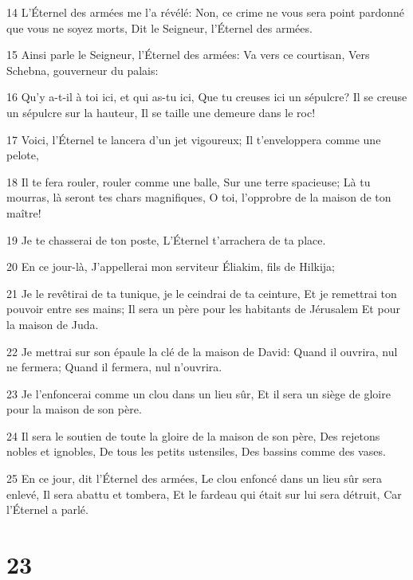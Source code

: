 \par 14 L'Éternel des armées me l'a révélé: Non, ce crime ne vous sera point pardonné que vous ne soyez morts, Dit le Seigneur, l'Éternel des armées.
\par 15 Ainsi parle le Seigneur, l'Éternel des armées: Va vers ce courtisan, Vers Schebna, gouverneur du palais:
\par 16 Qu'y a-t-il à toi ici, et qui as-tu ici, Que tu creuses ici un sépulcre? Il se creuse un sépulcre sur la hauteur, Il se taille une demeure dans le roc!
\par 17 Voici, l'Éternel te lancera d'un jet vigoureux; Il t'enveloppera comme une pelote,
\par 18 Il te fera rouler, rouler comme une balle, Sur une terre spacieuse; Là tu mourras, là seront tes chars magnifiques, O toi, l'opprobre de la maison de ton maître!
\par 19 Je te chasserai de ton poste, L'Éternel t'arrachera de ta place.
\par 20 En ce jour-là, J'appellerai mon serviteur Éliakim, fils de Hilkija;
\par 21 Je le revêtirai de ta tunique, je le ceindrai de ta ceinture, Et je remettrai ton pouvoir entre ses mains; Il sera un père pour les habitants de Jérusalem Et pour la maison de Juda.
\par 22 Je mettrai sur son épaule la clé de la maison de David: Quand il ouvrira, nul ne fermera; Quand il fermera, nul n'ouvrira.
\par 23 Je l'enfoncerai comme un clou dans un lieu sûr, Et il sera un siège de gloire pour la maison de son père.
\par 24 Il sera le soutien de toute la gloire de la maison de son père, Des rejetons nobles et ignobles, De tous les petits ustensiles, Des bassins comme des vases.
\par 25 En ce jour, dit l'Éternel des armées, Le clou enfoncé dans un lieu sûr sera enlevé, Il sera abattu et tombera, Et le fardeau qui était sur lui sera détruit, Car l'Éternel a parlé.

\chapter{23}

